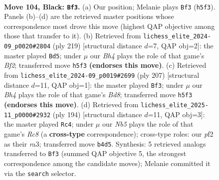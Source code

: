 \documentclass[11pt]{article}
\begin{document}
\clearpage

\begin{figure}[p]\centering
\begin{subfigure}{0.46\textwidth}\centering
\resizebox{\linewidth}{!}{%
\newchessgame
\chessboard[
  setfen={8/8/7k/7b/1n1B4/7K/5P2/8 b - - 54 104},
  showmover=false,
  pgfstyle=straightmove, color=movearrow, markmove={h5-f3}
]}
\caption{}
\end{subfigure}\hfill
\begin{subfigure}{0.46\textwidth}\centering
\resizebox{\linewidth}{!}{%
\newchessgame
\chessboard[
  setfen={8/5b2/5P2/8/1K6/3k4/8/B7 b - - 34 110},
  showmover=false,
  pgfstyle=straightmove, color=movearrow, markmove={f7-d5}
]}
\caption{}
\end{subfigure}
\\[4pt]
\begin{subfigure}{0.46\textwidth}\centering
\resizebox{\linewidth}{!}{%
\newchessgame
\chessboard[
  setfen={8/8/8/1B6/3k4/P7/1K6/3b4 b - - 30 104},
  showmover=false,
  pgfstyle=straightmove, color=movearrow, markmove={d1-f3}
]}
\caption{}
\end{subfigure}\hfill
\begin{subfigure}{0.46\textwidth}\centering
\resizebox{\linewidth}{!}{%
\newchessgame
\chessboard[
  setfen={2R5/5K2/5B2/7k/8/r7/8/8 w - - 65 98},
  showmover=false,
  pgfstyle=straightmove, color=movearrow, markmove={c8-c4}
]}
\caption{}
\end{subfigure}
\caption{\textbf{Move 104, Black: \texttt{Bf3}.} (a) Our position; Melanie plays \texttt{Bf3} (\texttt{h5f3}). Panels (b)--(d) are the retrieved master positions whose correspondence most drove this move (highest QAP objective among those that transfer to it). (b) Retrieved from \texttt{lichess\_elite\_2024-09\_p0020\#2804} (ply 219) [structural distance $d$=7, QAP obj=2]: the master played \texttt{Bd5}; under $\mu$ our \emph{Bh4} plays the role of that game's \emph{Bf2}; transferred move \texttt{h5f3} \textbf{(endorses this move)}. (c) Retrieved from \texttt{lichess\_elite\_2024-09\_p0019\#2699} (ply 207) [structural distance $d$=11, QAP obj=1]: the master played \texttt{Bf3}; under $\mu$ our \emph{Bh4} plays the role of that game's \emph{Bd8}; transferred move \texttt{h5f3} \textbf{(endorses this move)}. (d) Retrieved from \texttt{lichess\_elite\_2025-11\_p0000\#2932} (ply 194) [structural distance $d$=11, QAP obj=3]: the master played \texttt{Rc4}; under $\mu$ our \emph{Nb5} plays the role of that game's \emph{Rc8} (a \textbf{cross-type} correspondence); cross-type roles: our \emph{p}f2 as their \emph{r}a3; transferred move \texttt{b4d5}. Synthesis: 5 retrieved analogs transferred to \texttt{Bf3} (summed QAP objective 5, the strongest correspondence among the candidate moves); Melanie committed it via the \texttt{search} selector.}
\label{fig:thought-m207}
\end{figure}
\end{document}
